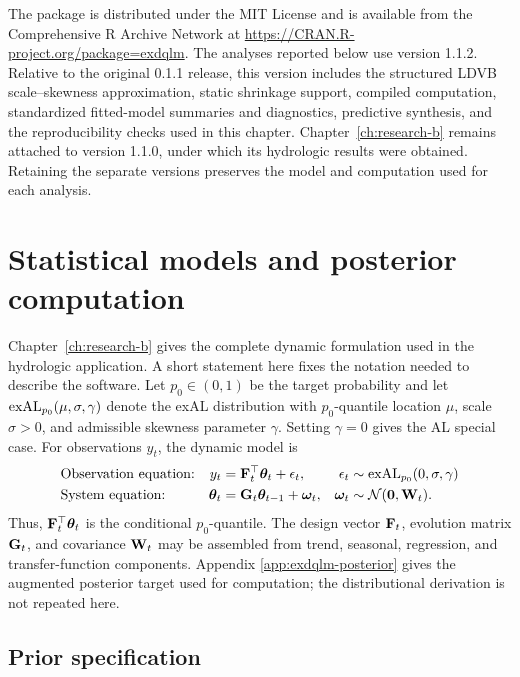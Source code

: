 The  package is distributed under the MIT License and is
available from the Comprehensive R Archive Network at
\url{https://CRAN.R-project.org/package=exdqlm}. The analyses reported below
use version 1.1.2. Relative to the original 0.1.1 release, this version includes
the structured LDVB
scale--skewness approximation, static shrinkage support, compiled computation,
standardized fitted-model summaries and diagnostics, predictive synthesis, and
the reproducibility checks used in this chapter. Chapter~\ref{ch:research-b}
remains attached to
version 1.1.0, under which its hydrologic results were obtained. Retaining the
separate versions preserves the model and computation used for each analysis.

\section{Statistical models and posterior computation}
\label{exd:sec:exdqlm}

Chapter~\ref{ch:research-b} gives the complete dynamic formulation used in the
hydrologic application. A short statement here fixes the notation needed to
describe the software. Let \(p_0\in(0,1)\) be the target probability and let
\(\operatorname{exAL}_{p_0}(\mu,\sigma,\gamma)\) denote the exAL distribution with
\(p_0\)-quantile location \(\mu\), scale \(\sigma>0\), and admissible
skewness parameter \(\gamma\). Setting \(\gamma=0\) gives the AL special case.
For observations \(y_t\), the dynamic model is
\begin{align}
\label{exd:EQ:exDLM}
& \text{Observation equation:} & y_t &= \mathbf{F}_t^\top \boldsymbol{\theta}_t + \epsilon_t,  & \epsilon_t & \sim \operatorname{exAL}_{p_0}(0,\sigma,\gamma) \\
\label{exd:EQ:exDLMevo}
& \text{System equation:} & \boldsymbol{\theta}_t &= \mathbf{G}_t \boldsymbol{\theta}_{t-1} + \boldsymbol{\omega}_t, & \boldsymbol{\omega}_t  & \sim \mathcal{N}(\mathbf{0},\mathbf{W}_t).
\end{align}
Thus, \(\mathbf{F}_t^\top\boldsymbol{\theta}_t\) is the conditional
\(p_0\)-quantile. The design vector \(\mathbf{F}_t\), evolution matrix
\(\mathbf{G}_t\), and covariance \(\mathbf{W}_t\) may be assembled from trend,
seasonal, regression, and transfer-function components. Appendix
\ref{app:exdqlm-posterior} gives the augmented posterior target used for
computation; the distributional derivation is not repeated here.

\subsection{Prior specification}
\label{exd:sec:priors}

